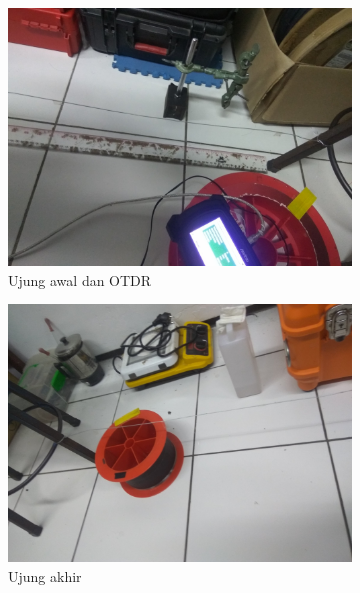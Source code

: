 \documentclass[12pt]{article}
\begin{document}
	\begin{figure}[!h]
		\centering
		\captionsetup{justification=centering}
		\begin{subfigure}[b]{0.3\textwidth}
			\includegraphics[width=\textwidth]{images/Bab_4/Bab_4_5a}	
			\caption{\small{Ujung awal dan OTDR}}		
		\end{subfigure}
		\begin{subfigure}[b]{0.3\textwidth}
			\includegraphics[width=\linewidth]{images/Bab_4/Bab_4_5b}
			\caption{\small{Ujung akhir}}			
		\end{subfigure}
		\begin{subfigure}[b]{0.4\textwidth}

\end{subfigure}
\end{figure}
\end{document}
